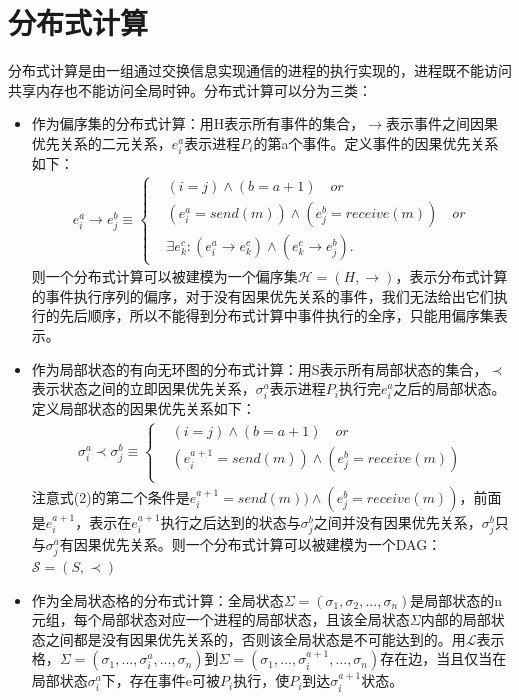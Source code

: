 \documentclass[UTF8]{article}
\begin{document}
\section{分布式计算}
分布式计算是由一组通过交换信息实现通信的进程的执行实现的，进程既不能访问共享内存也不能访问全局时钟。分布式计算可以分为三类：

\begin{itemize}
	\item 作为偏序集的分布式计算：用H表示所有事件的集合，$\rightarrow$表示事件之间因果优先关系的二元关系，$ e_i^a $表示进程$ P_i $的第a个事件。定义事件的因果优先关系如下：
	\begin{align}
	e_i^a \rightarrow e_j^b \equiv \left\{
	\begin{aligned}
		&(i=j)\land(b=a+1) \quad  or\\
		&(e_i^a=send(m))\land (e_j^b=receive(m)) \quad  or \\
		&\exists e_k^c:(e_i^a \rightarrow e_k^c)\land (e_k^c \rightarrow e_j^b).
	\end{aligned}
	\right.
	\end{align}
	则一个分布式计算可以被建模为一个偏序集$ \mathscr{H}=(H,\rightarrow) $，表示分布式计算的事件执行序列的偏序，对于没有因果优先关系的事件，我们无法给出它们执行的先后顺序，所以不能得到分布式计算中事件执行的全序，只能用偏序集表示。
	\item 作为局部状态的有向无环图的分布式计算：用S表示所有局部状态的集合，$ \prec $表示状态之间的立即因果优先关系，$ \sigma_i^a $表示进程$ P_i $执行完$ e_i^a $之后的局部状态。定义局部状态的因果优先关系如下：
	\begin{align}
	\sigma_i^a \prec \sigma_j^b \equiv \left\{
	\begin{aligned}
		&(i=j)\land(b=a+1) \quad  or\\
		&(e_i^{a+1}=send(m))\land (e_j^b=receive(m)) \\
	\end{aligned}
	\right.
	\end{align}
	注意式(2)的第二个条件是$ e_i^{a+1}=send(m))\land (e_j^b=receive(m)) $，前面是$ e_i^{a+1} $，表示在$ e_i^{a+1} $执行之后达到的状态与$ \sigma_j^b $之间并没有因果优先关系，$ \sigma_j^b $只与$ \sigma_j^a $有因果优先关系。则一个分布式计算可以被建模为一个DAG：$ \mathscr{S} = (S,\prec)$
	\item 作为全局状态格的分布式计算：全局状态$ \Sigma = (\sigma_1,\sigma_2,...,\sigma_n) $是局部状态的n元组，每个局部状态对应一个进程的局部状态，且该全局状态$ \Sigma $内部的局部状态之间都是没有因果优先关系的，否则该全局状态是不可能达到的。用$ \mathscr{L} $表示格，$ \Sigma = (\sigma_1,...,\sigma_i^a,...,\sigma_n) $到$ \Sigma = (\sigma_1,...,\sigma_i^{a+1},...,\sigma_n) $存在边，当且仅当在局部状态$ \sigma_i^a $下，存在事件e可被$ P_i $执行，使$ P_i $到达$ \sigma_i^{a+1} $状态。
\end{itemize}
\end{document}
